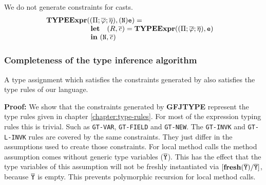 \documentclass[a4paper,USenglish,cleveref, autoref, thm-restate]{lipics-v2021}
\begin{document}
We do not generate constraints for casts.
\begin{gather*}
  \begin{array}{@{}l@{}l}
    \typeExpr &(({\mtypeEnvironment} ; \overline{\fieldAssumption};
                \overline{\localVarAssumption}), (\texttt{N})\mv{e} ) = \\
              &\begin{array}{ll}
                 \textbf{let} %
                 & (R, \consSet) = \typeExpr(({\mtypeEnvironment} ; \overline{\fieldAssumption};
                   \overline{\localVarAssumption}), \texttt{e})  \\
                 \multicolumn{2}{l}{\mathbf{in}\ (\mv{N}, \consSet) }
               \end{array}
  \end{array}
\end{gather*}


\subsubsection{Completeness of the type inference algorithm}
\begin{theoremAndi}
  A type assignment which satisfies the constraints generated by \FGJType also satisfies the type rules of our \TFGJ language.
\end{theoremAndi}
\textbf{Proof:}
We show that the constraints generated by \textbf{GFJTYPE}
represent the type rules given in chapter \ref{chapter:type-rules}.
For most of the expression typing rules this is trivial.
Such as \texttt{GT-VAR}, \texttt{GT-FIELD} and \texttt{GT-NEW}.
The \texttt{GT-INVK} and \texttt{GT-L-INVK} rules are covered by the same constraints.
They just differ in the assumptions used to create those constraints.
For local method calls the method assumption comes without generic type variables ($\mathtt{\overline{\tt Y}}$).
This has the effect that the type variables of this assumption will not be freshly instantiated
via $\mathtt{[\textbf{fresh}(\overline{\tt Y})/\overline{\tt Y}]}$, because $\mathtt{\overline{\tt Y}}$ is empty.
This prevents polymorphic recursion for local method calls.
\end{document}
